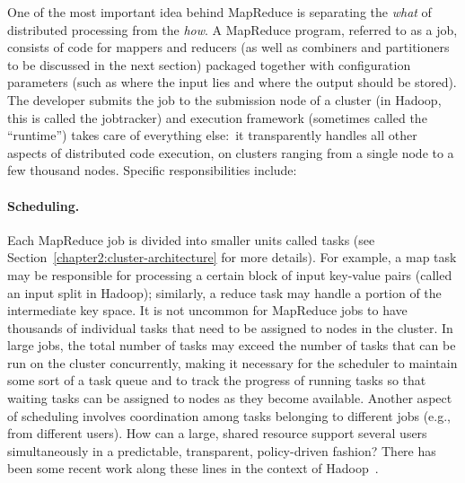 \documentclass[11pt]{article}
\begin{document}
One of the most important idea behind MapReduce is separating the \emph{
what} of distributed processing from the \emph{how}.  A MapReduce
program, referred to as a job, consists of code for mappers and
reducers (as well as combiners and partitioners to be discussed in the
next section) packaged together with configuration parameters (such as
where the input lies and where the output should be stored).  The
developer submits the job to the submission node of a cluster (in
Hadoop, this is called the jobtracker) and execution framework
(sometimes called the ``runtime'') takes care of everything else:\ it
transparently handles all other aspects of distributed code execution,
on clusters ranging from a single node to a few thousand nodes.
Specific responsibilities include:

\paragraph{Scheduling.} Each MapReduce job is divided into smaller
units called tasks (see Section~\ref{chapter2:cluster-architecture}
for more details).  For example, a map task may be responsible for
processing a certain block of input key-value pairs (called an input
split in Hadoop); similarly, a reduce task may handle a portion of the
intermediate key space.  It is not uncommon for MapReduce jobs to have
thousands of individual tasks that need to be assigned to nodes in the
cluster.  In large jobs, the total number of tasks may exceed the
number of tasks that can be run on the cluster concurrently, making it
necessary for the scheduler to maintain some sort of a task queue and
to track the progress of running tasks so that waiting tasks can be
assigned to nodes as they become available.  Another aspect of
scheduling involves coordination among tasks belonging to different
jobs (e.g., from different users).  How can a large, shared resource
support several users simultaneously in a predictable, transparent,
policy-driven fashion?  There has been some recent work along these
lines in the context of
Hadoop~\cite{Sandholm_Lai_2009,Zaharia_etal_2009}.
\end{document}
